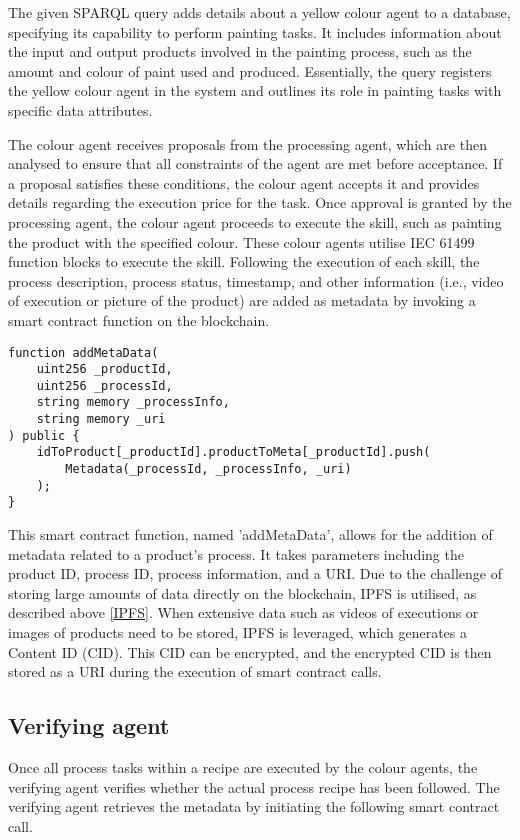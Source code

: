 \begin{bibunit}
The given SPARQL query adds details about a yellow colour agent to a database, specifying its capability to perform painting tasks. It includes information about the input and output products involved in the painting process, such as the amount and colour of paint used and produced. Essentially, the query registers the yellow colour agent in the system and outlines its role in painting tasks with specific data attributes.

The colour agent receives proposals from the processing agent, which are then analysed to ensure that all constraints of the agent are met before acceptance.  If a proposal satisfies these conditions, the colour agent accepts it and provides details regarding the execution price for the task. Once approval is granted by the processing agent, the colour agent proceeds to execute the skill,  such as painting the product with the specified colour. These colour agents utilise IEC 61499 function blocks to execute the skill. Following the execution of each skill, the process description, process status, timestamp, and other information (i.e., video of execution or picture of the product) are added as metadata by invoking a smart contract function on the blockchain.

\begin{lstlisting} 
function addMetaData(
    uint256 _productId,
    uint256 _processId,
    string memory _processInfo,
    string memory _uri
) public {
    idToProduct[_productId].productToMeta[_productId].push(
        Metadata(_processId, _processInfo, _uri)
    );
}
\end{lstlisting}

This smart contract function, named 'addMetaData', allows for the addition of metadata related to a product's process. It takes parameters including the product ID, process ID, process information, and a URI. Due to the challenge of storing large amounts of data directly on the blockchain, IPFS is utilised, as described above \ref{IPFS}. When extensive data such as videos of executions or images of products need to be stored, IPFS is leveraged, which generates a Content ID (CID). This CID can be encrypted, and the encrypted CID is then stored as a URI during the execution of smart contract calls.

\subsection{Verifying agent} 

Once all process tasks within a recipe are executed by the colour agents, the verifying agent verifies whether the actual process recipe has been followed. The verifying agent retrieves the metadata by initiating the following smart contract call.


\end{bibunit}
